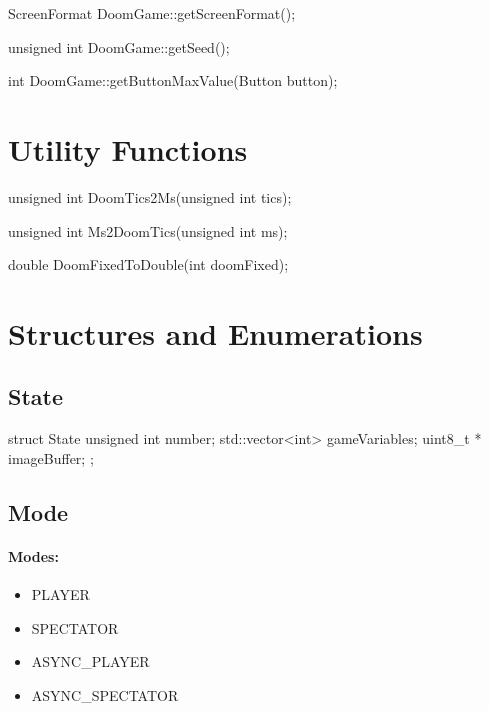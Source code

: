 \begin{clinee}
ScreenFormat DoomGame::getScreenFormat();
\end{clinee}

\begin{clinee}
unsigned int DoomGame::getSeed();
\end{clinee}

\begin{clinee}
int DoomGame::getButtonMaxValue(Button button);
\end{clinee}

\section {Utility Functions}


\begin{clinee}
unsigned int DoomTics2Ms(unsigned int tics);
\end{clinee}


\begin{clinee}
unsigned int Ms2DoomTics(unsigned int ms);
\end{clinee}


\begin{clinee}
double DoomFixedToDouble(int doomFixed);
\end{clinee}


\section{Structures and Enumerations}\label{sec:appendix_structs_and_enums}
\subsection{State}

	
\begin{clinee}
	struct State {
	    unsigned int number; 
	    std::vector<int> gameVariables;
	    uint8_t * imageBuffer;
	};
\end{clinee}

\subsection{Mode}\label{subsec:mode}

\paragraph{Modes:}

\begin{itemize}
	\item PLAYER
	\item SPECTATOR
	\item ASYNC\_PLAYER 
	\item ASYNC\_SPECTATOR 
\end{itemize}

